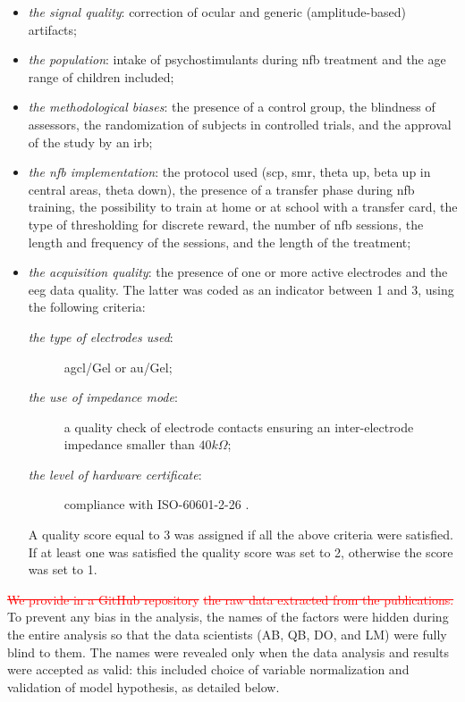 \begin{itemize}
  \item \emph{the signal quality}: correction of ocular and generic (amplitude-based) artifacts;
  \item \emph{the population}: intake of psychostimulants during \gls{nfb} treatment and the age range of children
  included;
  \item \emph{the methodological biases}: the presence of a control group, the blindness of assessors, 
  the randomization of subjects in controlled trials, and the approval of the study by an \gls{irb};
  \item \emph{the \gls{nfb} implementation}: the protocol used (\gls{scp}, \gls{smr}, 
  theta up, beta up in central areas, theta down), the presence of a transfer phase during \gls{nfb} training, the 
	possibility to train at home or at school with a transfer card, 
  the type of thresholding for discrete reward, the number of \gls{nfb} sessions, the length and frequency of the sessions, and the length of
  the treatment;
  \item \emph{the acquisition quality}: the presence of one or more active electrodes and the \gls{eeg} data quality. 
  The latter was coded as an indicator between 1 and 3, using the following criteria:   
	\begin{description}
	  \item[\emph{the type of electrodes used}:] \gls{agcl}/Gel or \gls{au}/Gel;
    \item[\emph{the use of impedance mode}:] a quality check of electrode contacts
		ensuring an inter-electrode impedance smaller than $40k\Omega$;  
    \item[\emph{the level of hardware certificate}:] compliance with ISO-60601-2-26 \citep{ISO-60601-2-26:2012}.
	\end{description}
	A quality score equal to 3 was assigned if all the above criteria were satisfied. If at least one was satisfied
	the quality score was set to 2, otherwise the score was set to 1.
\end{itemize}	

\textcolor{red}{\sout{We provide in a GitHub repository}} \citep{Bussalb2019} \textcolor{red}{\sout{the raw data extracted from the publications.}} To prevent any
bias in the analysis, the names of the factors were hidden during the entire analysis so that the data scientists (AB, QB,
DO, and LM) were fully blind to them. The names were revealed only when the data analysis and results were accepted as valid: 
this included choice of variable normalization and validation of model hypothesis, as detailed below.

